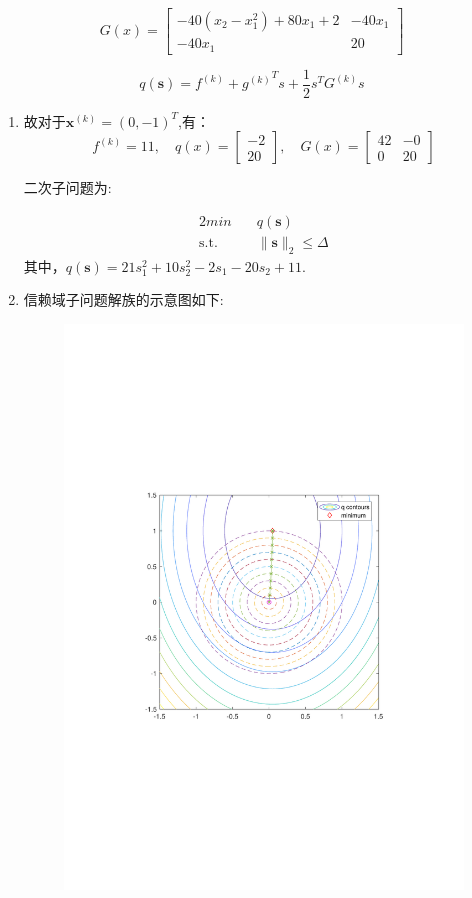 \documentclass[UTF8]{ctexart}
\begin{document}
\begin{enumerate}
\[G(x)=\begin{bmatrix}
-40(x_2-x_1^2)+80x_1+2&-40x_1\\
-40x_1&20
\end{bmatrix}\]

\[q(\bm{s})=f^{(k)}+{g^{(k)}}^Ts+\dfrac{1}{2}s^TG^{(k)}s\]

\begin{enumerate}
\item
故对于$\bm{x}^{(k)}=(0,-1)^T$,有：
\[f^{(k)}=11,\quad 
q(x)=\begin{bmatrix}
-2\\
20
\end{bmatrix},\quad 
G(x)=\begin{bmatrix}
42&-0\\
0&20
\end{bmatrix}\]

二次子问题为:

\begin{alignat}{2}
min \quad & q(\bm{s}) \nonumber\\
\mbox{s.t.}\quad
&\|\bm{s}\|_2\leq\Delta \nonumber
\end{alignat}
其中，$q(\bm{s})=21s_1^2+10s_2^2-2s_1-20s_2+11$.

\newpage
\item 
信赖域子问题解族的示意图如下:

\begin{figure}[H]
\centering
\includegraphics[width=11cm]{3.pdf}
\end{figure}


\end{enumerate}
\end{enumerate}
\end{document}
